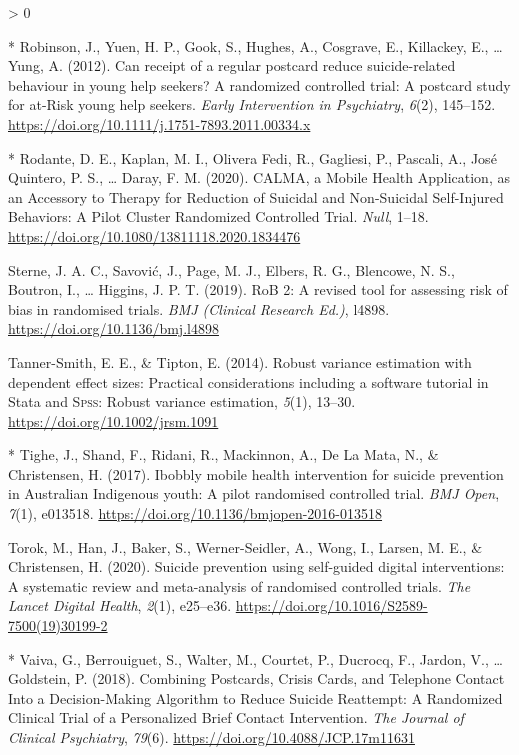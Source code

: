 \documentclass[
  english,
  man]{apa6}
\newlength{\cslhangindent}
\newenvironment{CSLReferences}[2] %
 {%
  \setlength{\parindent}{0pt}
  \ifodd #1 \everypar{\setlength{\hangindent}{\cslhangindent}}\ignorespaces\fi
  \ifnum #2 > 0
  \setlength{\parskip}{#2\baselineskip}
  \fi
 }%
 {}
\begin{document}
\begin{CSLReferences}{1}{0}
\leavevmode\hypertarget{ref-robinson2012}{}%
* Robinson, J., Yuen, H. P., Gook, S., Hughes, A., Cosgrave, E., Killackey, E., \ldots{} Yung, A. (2012). Can receipt of a regular postcard reduce suicide-related behaviour in young help seekers? A randomized controlled trial: A postcard study for at-{Risk} young help seekers. \emph{Early Intervention in Psychiatry}, \emph{6}(2), 145--152. \url{https://doi.org/10.1111/j.1751-7893.2011.00334.x}

\leavevmode\hypertarget{ref-rodante2020}{}%
* Rodante, D. E., Kaplan, M. I., Olivera Fedi, R., Gagliesi, P., Pascali, A., José Quintero, P. S., \ldots{} Daray, F. M. (2020). {CALMA}, a {Mobile Health Application}, as an {Accessory} to {Therapy} for {Reduction} of {Suicidal} and {Non}-{Suicidal Self}-{Injured Behaviors}: A {Pilot Cluster Randomized Controlled Trial}. \emph{Null}, 1--18. \url{https://doi.org/10.1080/13811118.2020.1834476}

\leavevmode\hypertarget{ref-sterne2019}{}%
Sterne, J. A. C., Savović, J., Page, M. J., Elbers, R. G., Blencowe, N. S., Boutron, I., \ldots{} Higgins, J. P. T. (2019). {RoB} 2: A revised tool for assessing risk of bias in randomised trials. \emph{BMJ (Clinical Research Ed.)}, l4898. \url{https://doi.org/10.1136/bmj.l4898}

\leavevmode\hypertarget{ref-tanner-smith2014}{}%
Tanner-Smith, E. E., \& Tipton, E. (2014). Robust variance estimation with dependent effect sizes: Practical considerations including a software tutorial in {Stata} and {\textsc{Spss}}: Robust variance estimation, \emph{5}(1), 13--30. \url{https://doi.org/10.1002/jrsm.1091}

\leavevmode\hypertarget{ref-tighe2017}{}%
* Tighe, J., Shand, F., Ridani, R., Mackinnon, A., De La Mata, N., \& Christensen, H. (2017). Ibobbly mobile health intervention for suicide prevention in {Australian Indigenous} youth: A pilot randomised controlled trial. \emph{BMJ Open}, \emph{7}(1), e013518. \url{https://doi.org/10.1136/bmjopen-2016-013518}

\leavevmode\hypertarget{ref-torok2020}{}%
Torok, M., Han, J., Baker, S., Werner-Seidler, A., Wong, I., Larsen, M. E., \& Christensen, H. (2020). Suicide prevention using self-guided digital interventions: A systematic review and meta-analysis of randomised controlled trials. \emph{The Lancet Digital Health}, \emph{2}(1), e25--e36. \url{https://doi.org/10.1016/S2589-7500(19)30199-2}

\leavevmode\hypertarget{ref-vaiva2018}{}%
* Vaiva, G., Berrouiguet, S., Walter, M., Courtet, P., Ducrocq, F., Jardon, V., \ldots{} Goldstein, P. (2018). Combining {Postcards}, {Crisis Cards}, and {Telephone Contact Into} a {Decision}-{Making Algorithm} to {Reduce Suicide Reattempt}: A {Randomized Clinical Trial} of a {Personalized Brief Contact Intervention}. \emph{The Journal of Clinical Psychiatry}, \emph{79}(6). \url{https://doi.org/10.4088/JCP.17m11631}


\end{CSLReferences}
\end{document}
